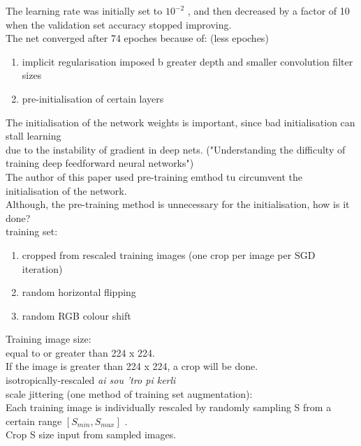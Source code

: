 \documentclass[11pt]{article}
\begin{document}
The learning rate was initially set to $10^{-2}$ , and then decreased by a factor of 10 when the validation set accuracy stopped improving. \\

The net converged after 74 epoches because of: (less epoches) \\
\begin{enumerate}
\item implicit regularisation imposed b greater depth and smaller convolution filter sizes \\
\item pre-initialisation of certain layers \\
\end{enumerate}


The initialisation of the network weights is important, since bad initialisation can stall learning \\
due to the instability of gradient in deep nets. ("Understanding the difficulty of training deep feedforward neural networks") \\

The author of this paper used pre-training emthod tu circumvent the initialisation of the network. \\
Although, the pre-training method is unnecessary for the initialisation, how is it done? \\


training set: \\
\begin{enumerate}
\item cropped from rescaled training images (one crop per image per SGD iteration) \\
\item random horizontal flipping \\
\item random RGB colour shift \\
\end{enumerate}

Training image size: \\
equal to or greater than 224 x 224. \\
If the image is greater than 224 x 224, a crop will be done. \\

isotropically-rescaled \emph{ai sou 'tro pi kerli} \\

scale jittering (one method of training set augmentation): \\
Each training image is individually rescaled by randomly sampling S from a certain range $[S_{min}, S_{max}]$ . \\
Crop S size input from sampled images. \\
\end{document}
